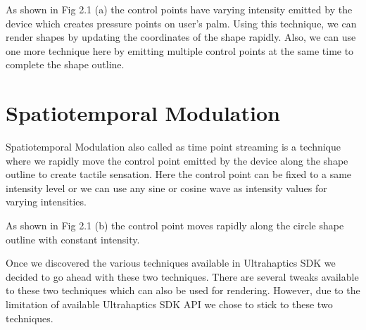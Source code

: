 As shown in Fig 2.1 (a) the control points have varying intensity emitted by the device which creates pressure points on user's palm. Using this technique, we can render shapes by updating the coordinates of  the shape rapidly. Also, we can use one more technique here by emitting multiple control points at the same time to complete the shape outline.


\section{Spatiotemporal Modulation}
\label{sec:related:sec2}

Spatiotemporal Modulation also called as time point streaming is a technique where we rapidly move the control point emitted by the device along the shape outline to create tactile sensation. Here the control point can be fixed to a same intensity level or we can use any sine or cosine wave as intensity values for varying intensities.\cite{tps} 

As shown in Fig 2.1 (b) the control point moves rapidly along the circle shape outline with constant intensity. 

Once we discovered the various techniques available in Ultrahaptics SDK we decided to go ahead with these two techniques. There are several tweaks available to these two techniques which can also be used for rendering. However, due to the limitation of available Ultrahaptics SDK API we chose to stick to these two techniques.  

